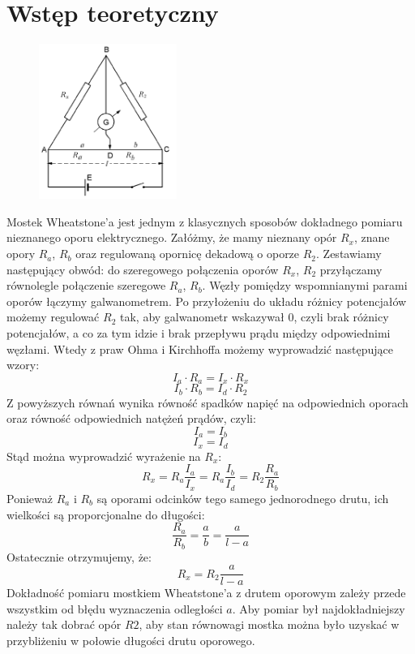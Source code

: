 \documentclass[a4paper,11pt]{article}
\begin{document}
\section{Wstęp teoretyczny}
\begin{figure}
\vspace*{-0.5cm}
\includegraphics[width=0.4\textwidth]{./schemat}
\end{figure}
Mostek Wheatstone’a jest jednym z klasycznych sposobów dokładnego pomiaru nieznanego oporu elektrycznego. Załóżmy, że mamy nieznany opór $R_x$, znane opory $R_a$, $R_b$ oraz regulowaną opornicę dekadową o oporze $R_2$. Zestawiamy następujący obwód: do szeregowego połączenia oporów $R_x$, $R_2$ przyłączamy równolegle połączenie szeregowe $R_a$, $R_b$. Węzły pomiędzy wspomnianymi parami oporów łączymy galwanometrem. Po przyłożeniu do układu różnicy potencjałów możemy regulować $R_2$ tak, aby galwanometr wskazywał 0, czyli brak różnicy potencjałów, a co za tym idzie i brak przepływu prądu między odpowiednimi węzłami. Wtedy z praw Ohma i Kirchhoffa możemy wyprowadzić następujące wzory: 
$$I_a\cdot R_a=I_x\cdot R_x$$
$$I_b\cdot R_b=I_d\cdot R_2$$
Z powyższych równań wynika równość spadków napięć na odpowiednich oporach oraz równość odpowiednich natężeń prądów, czyli:
$$I_a=I_b$$
$$I_x=I_d$$
Stąd można wyprowadzić wyrażenie na $R_x$:
$$R_x=R_a\frac{I_a}{I_x}=R_a\frac{I_b}{I_d}=R_2\frac{R_a}{R_b}$$
Ponieważ $R_a$ i $R_b$ są oporami odcinków tego samego jednorodnego drutu, ich wielkości są proporcjonalne do długości:
$$\frac{R_a}{R_b}=\dfrac{a}{b}=\dfrac{a}{l-a}$$
Ostatecznie otrzymujemy, że:
$$R_x=R_2\dfrac{a}{l-a}$$
Dokładność pomiaru mostkiem Wheatstone’a z drutem oporowym zależy przede wszystkim od błędu wyznaczenia odległości $a$. Aby pomiar był najdokładniejszy należy tak dobrać opór $R2$, aby stan równowagi mostka można było uzyskać w przybliżeniu w połowie długości drutu oporowego.
\end{document}
